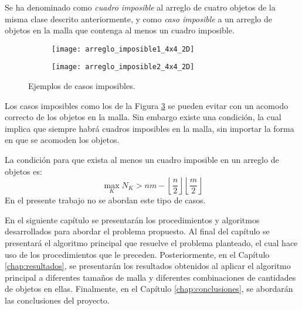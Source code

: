 Se ha denominado como \textsl{cuadro imposible} al arreglo de cuatro objetos de la misma clase descrito anteriormente, y como \textsl{caso imposible} a un arreglo de objetos en la malla que contenga al menos un cuadro imposible.
%
\begin{figure}[H]
	\begin{subfigure}{0.3\textwidth}
		\texttt{[image: arreglo\_imposible1\_4x4\_2D]}%
		\label{subfig:imposibles_1}%
	\end{subfigure}%
	\hspace{2.2cm}
	\begin{subfigure}{0.3\textwidth}
		\texttt{[image: arreglo\_imposible2\_4x4\_2D]}%
		\label{subfig:imposibles_2}%
	\end{subfigure}%
	\caption{Ejemplos de casos imposibles.}%
	\label{fig:casos_imposibles}%
\end{figure}
%
Los casos imposibles como los de la Figura \ref{fig:casos_imposibles} se pueden evitar con un acomodo correcto de los objetos en la malla.
Sin embargo existe una condición, la cual implica que siempre habrá cuadros imposibles en la malla, sin importar la forma en que se acomoden los objetos.

La condición para que exista al menos un cuadro imposible en un arreglo de objetos es:
%
\begin{equation}
	\label{eq:condicion_imposibles}
	\max_{K} N_K > nm - \left\lfloor \frac{n}{2} \right\rfloor \! \left\lfloor \frac{m}{2} \right\rfloor
\end{equation}
%
En el presente trabajo no se abordan este tipo de casos.

En el siguiente capítulo se presentarán los procedimientos y algoritmos desarrollados para abordar el problema propuesto.
Al final del capítulo se presentará el algoritmo principal que resuelve el problema planteado, el cual hace uso de los procedimientos que le preceden.
Posteriormente, en el Capítulo \ref{chap:resultados}, se presentarán los resultados obtenidos al aplicar el algoritmo principal a diferentes tamaños de malla y diferentes combinaciones de cantidades de objetos en ellas.
Finalmente, en el Capítulo \ref{chap:conclusiones}, se abordarán las conclusiones del proyecto.